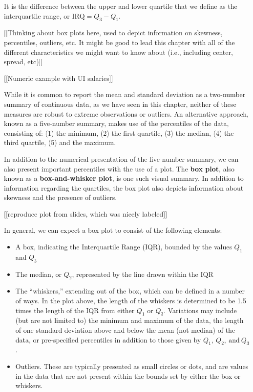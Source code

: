 \documentclass[
]{book}
\providecommand{\tightlist}{%
  \setlength{\itemsep}{0pt}\setlength{\parskip}{0pt}}
\theoremstyle{definition}
\theoremstyle{definition}
\theoremstyle{definition}
\theoremstyle{remark}
\begin{document}
It is the difference between the upper and lower quartile that we define as the interquartile range, or \(\text{IRQ} = Q_3 - Q_1\).

{[}{[}Thinking about box plots here, used to depict information on skewness, percentiles, outliers, etc. It might be good to lead this chapter with all of the different characteristics we might want to know about (i.e., including center, spread, etc){]}{]}

{[}{[}Numeric example with UI salaries{]}{]}

While it is common to report the mean and standard deviation as a two-number summary of continuous data, as we have seen in this chapter, neither of these measures are robust to extreme observations or outliers. An alternative approach, known as a five-number summary, makes use of the percentiles of the data, consisting of: (1) the minimum, (2) the first quartile, (3) the median, (4) the third quartile, (5) and the maximum.

In addition to the numerical presentation of the five-number summary, we can also present important percentiles with the use of a plot. The \textbf{box plot}, also known as a \textbf{box-and-whisker plot}, is one such visual summary. In addition to information regarding the quartiles, the box plot also depicts information about skewness and the presence of outliers.

{[}{[}reproduce plot from slides, which was nicely labeled{]}{]}

In general, we can expect a box plot to consist of the following elements:

\begin{itemize}
\tightlist
\item
  A box, indicating the Interquartile Range (IQR), bounded by the values \(Q_1\) and \(Q_3\)
\item
  The median, or \(Q_2\), represented by the line drawn within the IQR
\item
  The ``whiskers,'' extending out of the box, which can be defined in a number of ways. In the plot above, the length of the whiskers is determined to be 1.5 times the length of the IQR from either \(Q_1\) or \(Q_3\). Variations may include (but are not limited to) the minimum and maximum of the data, the length of one standard deviation above and below the mean (not median) of the data, or pre-specified percentiles in addition to those given by \(Q_1, \ Q_2, \ \text{and} \ Q_3\).
\item
  Outliers. These are typically presented as small circles or dots, and are values in the data that are not present within the bounds set by either the box or whiskers.
\end{itemize}
\end{document}
